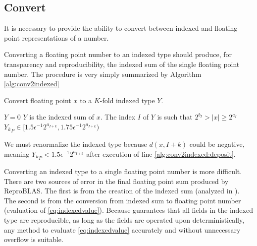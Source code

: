   \subsection{Convert}
    \label{sec:primitiveops_convert}
    It is necessary to provide the ability to convert between indexed and floating point representations of a number.

    Converting a floating point number to an indexed type should produce, for transparency and reproducibility, the indexed sum of the single floating point number.
    The procedure is very simply summarized by Algorithm \ref{alg:conv2indexed}

    \begin{samepage}
    \begin{alg}
      Convert floating point $x$ to a $K$-fold indexed type $Y$.
      \begin{algorithmic}[1]
          \State $Y = 0$
          \State {}
          \State {} \label{alg:conv2indexed:deposit}
          \State {}
        \EndFunction
        \Ensure
          $Y$ is the indexed sum of $x$.
          The index $I$ of $Y$ is such that $2^{b_I} > |x| \geq 2^{a_I}$
          ${Y_k}_P \in [1.5  \epsilon^{-1} 2^{a_{I + k}}, 1.75  \epsilon^{-1} 2^{a_{I + k}})$
      \end{algorithmic}
      \label{alg:conv2indexed}
    \end{alg}
    \end{samepage}

    We must renormalize the indexed type because $d(x, I + k)$ could be negative, meaning ${Y_k}_P < 1.5  \epsilon^{-1} 2^{a_{I + k}}$ after execution of line \ref{alg:conv2indexed:deposit}.

    Converting an indexed type to a single floating point number is more difficult. There are two sources of error in the final floating point sum produced by ReproBLAS. The first is from the creation of the indexed sum (analyzed in \cite{repsum}). The second is from the conversion from indexed sum to floating point number (evaluation of  \eqref{eq:indexedvalue}).
    Because \cite{repsum} guarantees that all fields in the indexed type are reproducible, as long as the fields are operated upon deterministically, any method to evaluate  \eqref{eq:indexedvalue} accurately and without unnecessary overflow is suitable.


